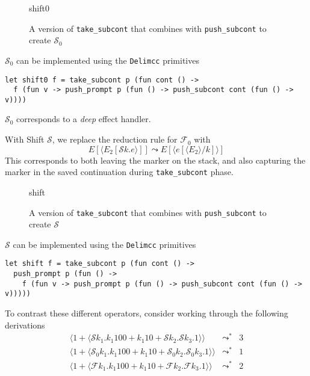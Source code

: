 \begin{figure}[H]
    \centering
    {shift0}
    \caption{A version of \texttt{take\_subcont} that combines with \texttt{push\_subcont} to create $\mathcal{S}_0$}
    \label{fig:shift-0-stack}
\end{figure}

$\mathcal{S}_0$ can be implemented using the \texttt{Delimcc} primitives

\begin{verbatim}
let shift0 f = take_subcont p (fun cont () ->
  f (fun v -> push_prompt p (fun () -> push_subcont cont (fun () -> v))))
\end{verbatim}

$\mathcal{S}_0$ corresponds to a \textit{deep} effect handler. 

With Shift $\mathcal{S}$, we replace the reduction rule for $\mathcal{F}_0$ with
\[  E[\langle E_2[\mathcal{S} k. e \rangle]] \leadsto E[\langle e[\langle E_2 \rangle/k]\rangle]\]
This corresponds to both leaving the marker on the stack, and also capturing the marker in the saved continuation during \texttt{take\_subcont} phase.

\begin{figure}[H]
    \centering
    {shift}
    \caption{A version of \texttt{take\_subcont} that combines with \texttt{push\_subcont} to create $\mathcal{S}$}
    \label{fig:shift-stack}
\end{figure}

$\mathcal{S}$ can be implemented using the \texttt{Delimcc} primitives

\begin{verbatim}
let shift f = take_subcont p (fun cont () ->
  push_prompt p (fun () -> 
    f (fun v -> push_prompt p (fun () -> push_subcont cont (fun () -> v)))))
\end{verbatim}

To contrast these different operators, consider working through the following derivations
\[\begin{array}{lll}
     \langle 1 + \langle \mathcal{S} k_1. k_1 100 + k_1 10 + \mathcal{S} k_2 . \mathcal{S} k_3 . 1\rangle\rangle & \leadsto^{*} & 3 \\
     \langle 1 + \langle\mathcal{S}_0 k_1. k_1 100 + k_1 10 + \mathcal{S}_0 k_2 . \mathcal{S}_0 k_3 . 1\rangle\rangle & \leadsto^{*} & 1 \\ 
     \langle 1 + \langle\mathcal{F} k_1. k_1 100 + k_1 10 + \mathcal{F} k_2 . \mathcal{F} k_3 . 1 \rangle\rangle& \leadsto^{*} & 2
\end{array}\]

